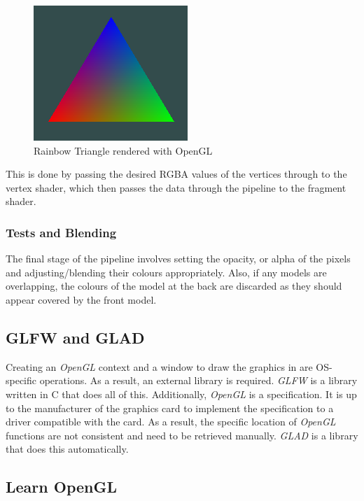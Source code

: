 \documentclass[12pt]{article}
\begin{document}
    \begin{figure}[H]
        \begin{center}
            \includegraphics{rainbowTriangle.png}
            \caption{Rainbow Triangle rendered with OpenGL}
        \end{center}
    \end{figure}

    This is done by passing the desired RGBA values of the vertices through to the vertex shader, which then passes the data through the pipeline to the fragment shader.

    \subsubsection{Tests and Blending}

    The final stage of the pipeline involves setting the opacity, or alpha of the pixels and adjusting/blending their colours appropriately. Also, if any models are overlapping, the colours of the model at the back are discarded as they should appear covered by the front model.

    \subsection{GLFW and GLAD}

    Creating an \textit{OpenGL} context and a window to draw the graphics in are OS-specific operations. As a result, an external library is required. \textit{GLFW}\cite{glfw} is a library written in C that does all of this. Additionally, \textit{OpenGL} is a specification. It is up to the manufacturer of the graphics card to implement the specification to a driver compatible with the card. As a result, the specific location of \textit{OpenGL} functions are not consistent and need to be retrieved manually. \textit{GLAD}\cite{glad} is a library that does this automatically.

    \subsection{Learn OpenGL}
\end{document}
